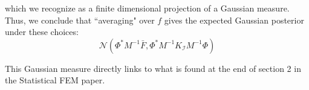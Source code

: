 which we recognize as a finite dimensional projection of a Gaussian measure. Thus, we conclude that ``averaging" over $f$ gives the expected Gaussian posterior under these choices:
\begin{equation}
    \label{average_posterior_FEM_prior}
    \mathcal{N}(\Phi^{*}M^{-1}\bar{F},\Phi^{*}M^{-1}K_{\mathcal{I}}M^{-1}\Phi)
\end{equation}

This Gaussian measure directly links to what is found at the end of section 2 in the Statistical FEM paper.
